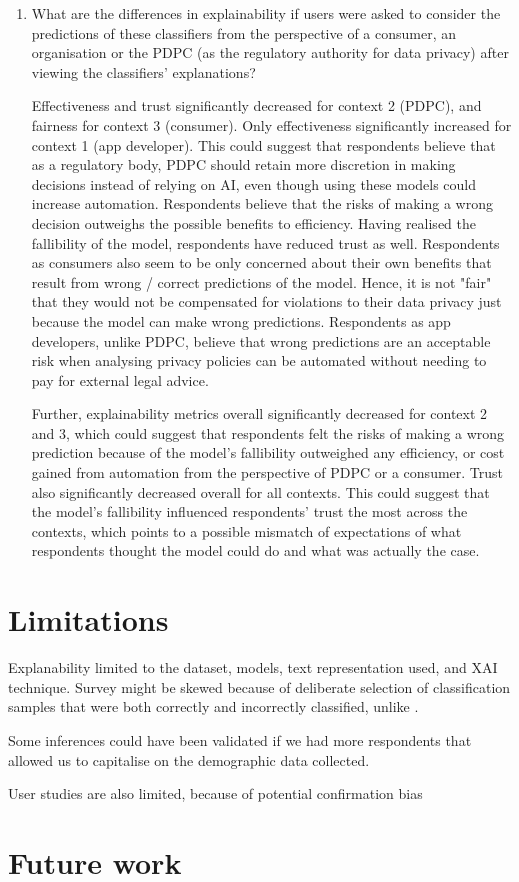 \begin{enumerate}
    \item What are the differences in explainability if users were asked to consider the predictions of these classifiers from the perspective of a consumer, an organisation or the PDPC (as the regulatory authority for data privacy) after viewing the classifiers' explanations?
    
    Effectiveness and trust significantly decreased for context 2 (PDPC), and fairness for context 3 (consumer). Only effectiveness significantly increased for context 1 (app developer). This could suggest that respondents believe that as a regulatory body, PDPC should retain more discretion in making decisions instead of relying on AI, even though using these models could increase automation. Respondents believe that the risks of making a wrong decision outweighs the possible benefits to efficiency. Having realised the fallibility of the model, respondents have reduced trust as well. Respondents as consumers also seem to be only concerned about their own benefits that result from wrong / correct predictions of the model. Hence, it is not "fair" that they would not be compensated for violations to their data privacy just because the model can make wrong predictions. Respondents as app developers, unlike PDPC, believe that wrong predictions are an acceptable risk when analysing privacy policies can be automated without needing to pay for external legal advice.

    Further, explainability metrics overall significantly decreased for context 2 and 3, which could suggest that respondents felt the risks of making a wrong prediction because of the model's fallibility outweighed any efficiency, or cost gained from automation from the perspective of PDPC or a consumer. Trust also significantly decreased overall for all contexts. This could suggest that the model's fallibility influenced respondents' trust the most across the contexts, which points to a possible mismatch of expectations of what respondents thought the model could do and what was actually the case. 
\end{enumerate}


\section{Limitations}
Explanability limited to the dataset, models, text representation used, and XAI technique. Survey might be skewed because of deliberate selection of classification samples that were both correctly and incorrectly classified, unlike \cite{gorski2021}.

Some inferences could have been validated if we had more respondents that allowed us to capitalise on the demographic data collected.

User studies are also limited, because of potential confirmation bias

\section{Future work}